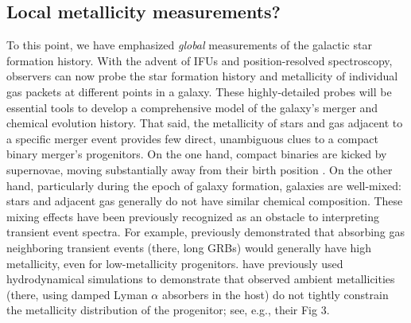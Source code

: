 \documentclass[nofootinbib,twocolumn,prd]{emulateapj}
\begin{document}
\subsection{Local metallicity measurements?}
To this point, we have emphasized \emph{global} measurements of the galactic star formation history.  With the advent of
IFUs and position-resolved spectroscopy, observers can now probe the star formation history and metallicity of
individual gas packets at different points in a galaxy.  
%
These highly-detailed probes will be essential tools to develop a comprehensive model of the galaxy's merger and
chemical evolution history.  That said, the metallicity of stars and gas adjacent to a specific merger event provides
few direct, unambiguous clues to a compact binary merger's progenitors.  
On the one hand, compact binaries are kicked by supernovae, moving substantially away from their birth position
\cite{2013ApJ...776...18F,2014ARAA..52...43B}. 
On the other hand, particularly during the epoch of galaxy formation, galaxies are well-mixed: stars and adjacent gas generally do not have
similar chemical composition.  
These mixing effects have been previously recognized as an obstacle to interpreting transient event spectra.  For
example,   \cite{2010MNRAS.402.1523P} previously demonstrated that absorbing gas neighboring transient events (there, long GRBs)
would generally have high metallicity, even for low-metallicity progenitors.   
%
\citet{2010MNRAS.402.1523P} have previously used hydrodynamical simulations to demonstrate that observed ambient
metallicities (there, using damped Lyman $\alpha$ absorbers in the host) do not tightly constrain the metallicity
distribution of the progenitor; see, e.g., their Fig 3.
%





\end{document}
